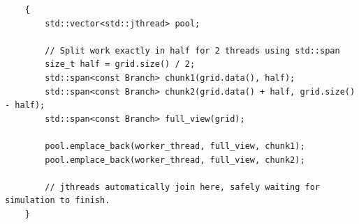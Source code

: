 \begin{verbatim}
    {
        std::vector<std::jthread> pool;
        
        // Split work exactly in half for 2 threads using std::span
        size_t half = grid.size() / 2;
        std::span<const Branch> chunk1(grid.data(), half);
        std::span<const Branch> chunk2(grid.data() + half, grid.size() - half);
        std::span<const Branch> full_view(grid);
        
        pool.emplace_back(worker_thread, full_view, chunk1);
        pool.emplace_back(worker_thread, full_view, chunk2);
        
        // jthreads automatically join here, safely waiting for simulation to finish.
    }
\end{verbatim}
